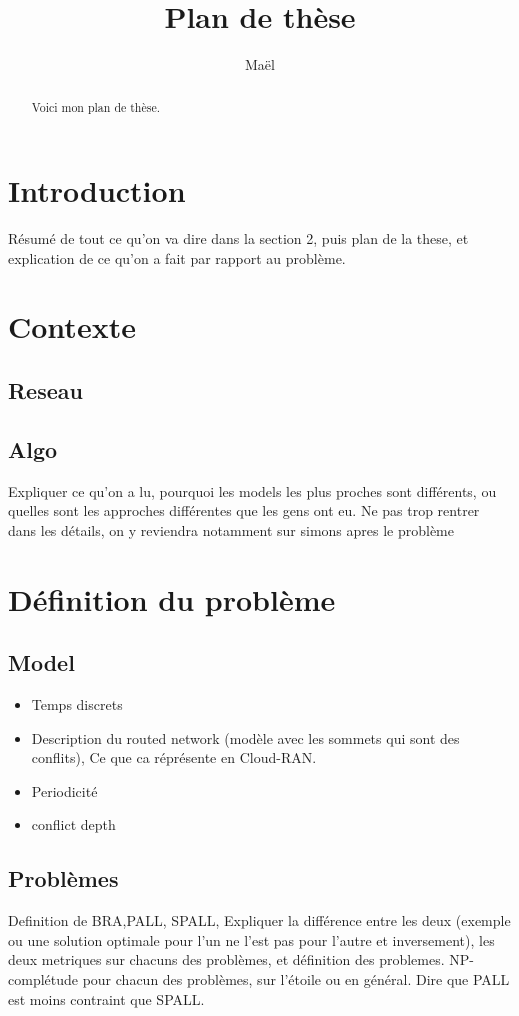 \documentclass[a4paper,10pt]{article}
\title{Plan de thèse}
\author{Maël}
\begin{document}
 
\maketitle

\begin{abstract}
Voici mon plan de thèse.
\end{abstract}
\section{Introduction}

Résumé  de tout ce qu'on va dire dans la section 2, puis plan de la these, et explication de ce qu'on a fait par rapport au problème.

\section{Contexte}

\subsection{Reseau}


  
\subsection{Algo}
Expliquer ce qu'on a lu, pourquoi les models les plus proches sont différents, ou quelles sont les approches différentes que les gens ont eu. Ne pas trop rentrer dans les détails, on y reviendra notamment sur simons apres le problème

\section{Définition du problème}

\subsection{Model}
\begin{itemize}
 \item Temps discrets
 \item Description du routed network (modèle avec les sommets qui sont des conflits), Ce que ca réprésente en Cloud-RAN.
 \item Periodicité
 \item conflict depth
 
\end{itemize}
\subsection{Problèmes}
Definition de BRA,PALL, SPALL, Expliquer la différence entre les deux (exemple ou une solution optimale pour l'un ne l'est pas pour l'autre et inversement), les deux metriques sur chacuns des problèmes, et définition des problemes. NP-complétude pour chacun des problèmes, sur l'étoile ou en général.
Dire que PALL est moins contraint que SPALL.
\end{document}
